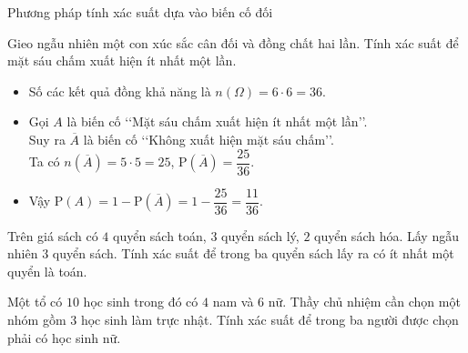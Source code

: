 \begin{dang}{Phương pháp tính xác suất dựa vào biến cố đối}
\end{dang}
\viduminhhoa
\setcounter{vd}{0}
\begin{vd}
	Gieo ngẫu nhiên một con xúc sắc cân đối và đồng chất hai lần. Tính xác suất để mặt sáu chấm xuất hiện ít nhất một lần.
	\loigiai
	{
		\begin{itemize}
			\item Số các kết quả đồng khả năng là $n(\Omega)=6\cdot 6=36$.
			\item Gọi $A$ là biến cố \lq\lq  Mặt sáu chấm xuất hiện ít nhất một lần\rq\rq.\\
			Suy ra $\overline{A}$ là biến cố \lq\lq  Không xuất hiện mặt sáu chấm\rq\rq .\\
			Ta có $n(\overline{A})=5\cdot 5=25$, $\mathrm{P}(\overline{A})=\dfrac{25}{36}$.
			\item Vậy $\mathrm{P}(A)=1-\mathrm{P}(\overline{A})=1-\dfrac{25}{36}=\dfrac{11}{36}$.
		\end{itemize}
	}
\end{vd}	
\begin{vd}
	Trên giá sách có $4$ quyển sách toán, $3$ quyển sách lý, $2$ quyển sách hóa. Lấy ngẫu nhiên $3$ quyển sách. Tính xác suất để trong ba quyển sách lấy ra có ít nhất một quyển là toán.
\end{vd}
\begin{vd}
	Một tổ có $10$ học sinh trong đó có $4$ nam và $6$ nữ. Thầy chủ nhiệm cần chọn một nhóm gồm $3$ học sinh làm trực nhật. Tính xác suất để trong ba người được chọn phải có học sinh nữ.
\end{vd}
